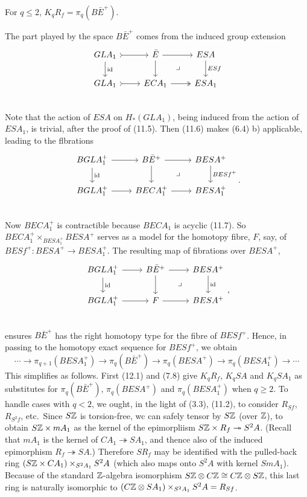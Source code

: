 \begin{prop}
 	For $q \leqslant 2$, $K_qR_f = \pi_q(B\bar{E}^+)$.
 \end{prop} 

The part played by the space $B\bar{E}^+$ comes from the induced group extension 
\[
\begin{tikzcd}
GLA_1 \arrow[r,tail] \arrow[d,"\id"]&\bar{E} \arrow{r} \arrow{d} \arrow[dr, phantom, "\lrcorner"] & ESA \arrow{d}{ESf}\\
GLA_1 \arrow[r,tail]&ECA_1 \arrow[two heads]{r} & ESA_1 \\
\end{tikzcd}
\]
Note that the action of $ESA$ on $H_*(GLA_1)$, being induced from the action of $ESA_1$, is trivial, after the proof of (11.5). Then (11.6) makes (6.4) b) applicable, leading to the flbrations
\[
\begin{tikzcd}
BGLA_1^+ \arrow[r] \arrow[d,"\id"]&B\bar{E}^+ \arrow{r} \arrow{d} \arrow[dr, phantom, "\lrcorner"] & BESA^+ \arrow{d}{BESf^+}\\
BGLA_1^+ \arrow[r]&BECA_1^+ \arrow{r} & BESA_1^+ \\
\end{tikzcd}.
\]
Now $BECA_1^+$ is contractible because $BECA_1$ is acyclic (11.7). So $BECA_1^+\times_{BESA_1^+} BESA^+ $ serves as a model for the homotopy fibre, $F$, say, of $BESf^+ \colon   BESA^+ \longrightarrow BESA_1^+$. The resulting map of fibrations over $BESA^+$,
\[
\begin{tikzcd}
BGLA_1^+ \arrow[r] \arrow[d,"\id"]&B\bar{E}^+ \arrow{r} \arrow{d} \arrow[dr, phantom, "\lrcorner"] & BESA^+ \arrow{d}{\id}\\
BGLA_1^+ \arrow[r]&F \arrow{r} & BESA^+ \\
\end{tikzcd},
\]
ensures $B\bar{E}^+$ has the right homotopy type for the fibre of $BESf^+$. Hence, in passing to the homotopy exact sequence for $BESf^+$, we obtain
\[\cdots \longrightarrow \pi_{q+1}(BESA_1^+)\longrightarrow  \pi_q(B\bar{E}^+) \longrightarrow  \pi_q(BESA^+) \longrightarrow  \pi_q(BESA_1^+) \longrightarrow \cdots\]
This simplifies as follows. First (12.1) and (7.8) give $K_qR_f$, $K_qSA$ and $K_qSA_1$ as substitutes for $\pi_q(B\bar{E}^+)$, $\pi_q(BESA^+)$ and $\pi_q(BESA_1^+)$ when $q \geqslant 2$. To handle cases with $q < 2$, we ought, in the light of (3.3), (11.2), to consider $R_{Sf}$, $R_{S^2f}$, etc.\  Since $S\mathbb{Z}$ is torsion-free, wc can safely tensor by $S\mathbb{Z}$ (over $\mathbb{Z}$), to obtain $S\mathbb{Z} \times mA_1$ as the kernel of the epimorpliism $S\mathbb{Z} \times R_f \twoheadrightarrow S^2A$. (Recall that $mA_1$ is the kernel of $CA_1\twoheadrightarrow SA_1$, and thence also of the induced epimorphism
$R_f \twoheadrightarrow SA$.) Therefore $SR_f$ may be identified with the pulled-back ring $(S\mathbb{Z} \times CA_1) \times_{S^2A_1} S^2A$ (which also maps onto $S^2A$ with kernel $SmA_1$). Because of the standard $\mathbb{Z}$-algebra isomorphism
$S\mathbb{Z} \otimes C\mathbb{Z}  \cong C\mathbb{Z} \otimes S\mathbb{Z}$, this last ring is naturally isomorphic to $(C\mathbb{Z} \otimes SA_1) \times_{S^2A_1} S^2A = R_{Sf}$.

